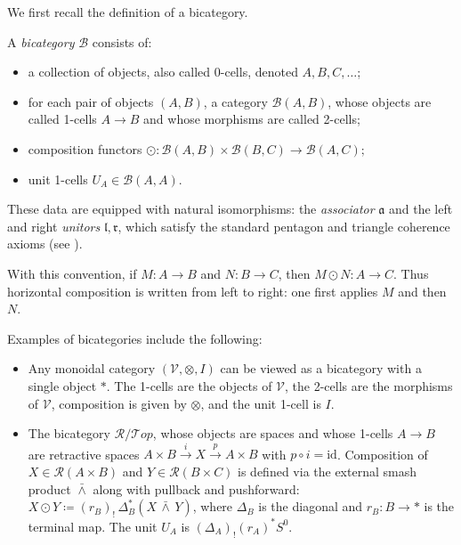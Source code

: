 \documentclass[11pt,oneside]{amsart}
\numberwithin{equation}{section}
\numberwithin{figure}{section}
\theoremstyle{plain}
\theoremstyle{definition}
\theoremstyle{remark}
\begin{document}
We first recall the definition of a bicategory.


\begin{definition} \label{def:bicategory_convention}
A \emph{bicategory} \( \mathcal{B} \) consists of:
\begin{itemize}
    \item a collection of objects, also called 0-cells, denoted
    \( A, B, C, \ldots \);
    \item for each pair of objects \( (A,B) \), a category
    \( \mathcal{B}(A,B) \), whose objects are called 1-cells
    \( A \to B \) and whose morphisms are called 2-cells;
    \item composition functors
    \(
    \odot \colon \mathcal{B}(A,B) \times \mathcal{B}(B,C)
    \to \mathcal{B}(A,C);
    \)
    \item unit 1-cells \( U_A \in \mathcal{B}(A,A) \).
\end{itemize}
    
These data are equipped with natural isomorphisms: the \emph{associator} \(\mathfrak a\)
and the left and right \emph{unitors} \(\mathfrak l,\mathfrak r\),
which satisfy the standard pentagon and triangle coherence axioms
(see \cite[Definition~4.1.1]{PSSY}).
\end{definition}

With this convention, if \(M\colon A\to B\) and \(N\colon B\to C\), then
\(
M\odot N\colon A\to C.
\)
Thus horizontal composition is written from left to right: one first applies \(M\) and then \(N\).

\begin{example}\label{ex:bicat_examples}
Examples of bicategories include the following:
\begin{itemize}
  \item Any monoidal category $(\mathcal{V}, \otimes, I)$ can be viewed as a bicategory with a single object $\ast$.
  The 1-cells are the objects of $\mathcal{V}$, the 2-cells are the morphisms of $\mathcal{V}$, composition is given by $\otimes$, and the unit 1-cell is $I$.
\item \cite[\S7.5]{MAL} The bicategory $\mathcal{R}/\mathcal{T}op$, whose objects are spaces and whose 1-cells $A \to B$ are retractive spaces $A \times B \xrightarrow{i} X \xrightarrow{p} A \times B$ with $p \circ i = \mathrm{id}$. Composition of $X \in \mathcal{R}(A \times B)$ and $Y \in \mathcal{R}(B \times C)$ is defined via the external smash product $\bar{\wedge}$ along with pullback and pushforward: $X \odot Y \coloneqq (r_B)_! \,\Delta_B^* (X \,\bar{\wedge}\, Y)$, where $\Delta_B$ is the diagonal and $r_B \colon B \to *$ is the terminal map. The unit $U_A$ is $(\Delta_A)_!(r_A)^*S^0$.
\end{itemize}
\end{example}
\end{document}

